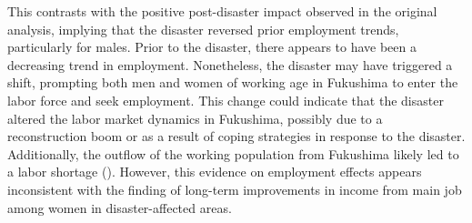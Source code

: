 \documentclass[a4paper,12pt]{article}
\begin{document}
This contrasts with the positive post-disaster impact observed in the original analysis, implying that the disaster reversed prior employment trends, particularly for males. Prior to the disaster, there appears to have been a decreasing trend in employment. Nonetheless, the disaster may have triggered a shift, prompting both men and women of working age in Fukushima to enter the labor force and seek employment. This change could indicate that the disaster altered the labor market dynamics in Fukushima, possibly due to a reconstruction boom or as a result of coping strategies in response to the disaster. Additionally, the outflow of the working population from Fukushima likely led to a labor shortage (\citet{Zhang2014Radiation-DrivenAccident}). However, this evidence on employment effects appears inconsistent with the finding of long-term improvements in income from main job among women in disaster-affected areas.

\end{document}
